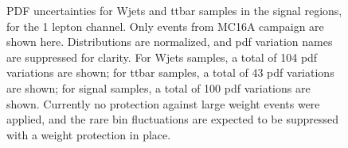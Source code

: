 \begin{figure}[ht]
        \caption{PDF uncertainties for Wjets and ttbar samples in the signal regions, for the 1 lepton channel. Only events from MC16A campaign are shown here. Distributions are normalized, and pdf variation names are suppressed for clarity. For Wjets samples, a total of 104 pdf variations are shown; for ttbar samples, a total of 43 pdf variations are shown; for signal samples, a total of 100 pdf variations are shown. Currently no protection against large weight events were applied, and the rare bin fluctuations are expected to be suppressed with a weight protection in place.}
    \label{fig:PDFUnc1Lep_bkg}
\end{figure}

